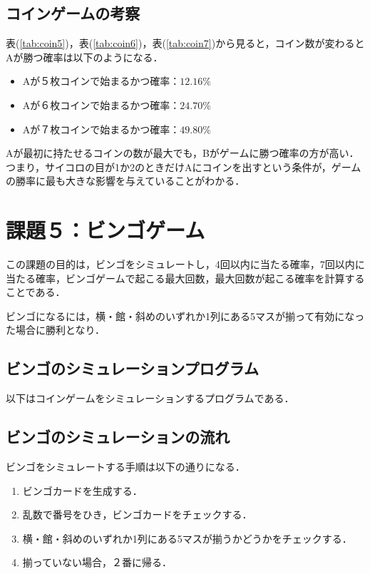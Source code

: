 \documentclass[a4j, titlepage]{jarticle}
\begin{document}
      \subsection{コインゲームの考察}
        表(\ref{tab:coin5})，表(\ref{tab:coin6})，表(\ref{tab:coin7})から見ると，コイン数が変わるとAが勝つ確率は以下のようになる．
        \begin{screen}
          \begin{itemize}
            \item Aが５枚コインで始まるかつ確率：$12.16\%$
            \item Aが６枚コインで始まるかつ確率：$24.70\%$
            \item Aが７枚コインで始まるかつ確率：$49.80\%$
          \end{itemize}
        \end{screen}
        Aが最初に持たせるコインの数が最大でも，Bがゲームに勝つ確率の方が高い．つまり，サイコロの目が1か2のときだけAにコインを出すという条件が，ゲームの勝率に最も大きな影響を与えていることがわかる．
    
    \section{課題５：ビンゴゲーム}
      この課題の目的は，ビンゴをシミュレートし，4回以内に当たる確率，7回以内に当たる確率，ビンゴゲームで起こる最大回数，最大回数が起こる確率を計算することである．

      ビンゴになるには，横・館・斜めのいずれか1列にある5マスが揃って有効になった場合に勝利となり．

      \subsection{ビンゴのシミュレーションプログラム}
        以下はコインゲームをシミュレーションするプログラムである．
         
      
      \subsection{ビンゴのシミュレーションの流れ}
        ビンゴをシミュレートする手順は以下の通りになる．
        \begin{screen}
          \begin{enumerate}
            \item ビンゴカードを生成する．
            \item 乱数で番号をひき，ビンゴカードをチェックする．
            \item 横・館・斜めのいずれか1列にある5マスが揃うかどうかをチェックする．
            \item 揃っていない場合，２番に帰る．
          \end{enumerate}
        \end{screen}
\end{document}

